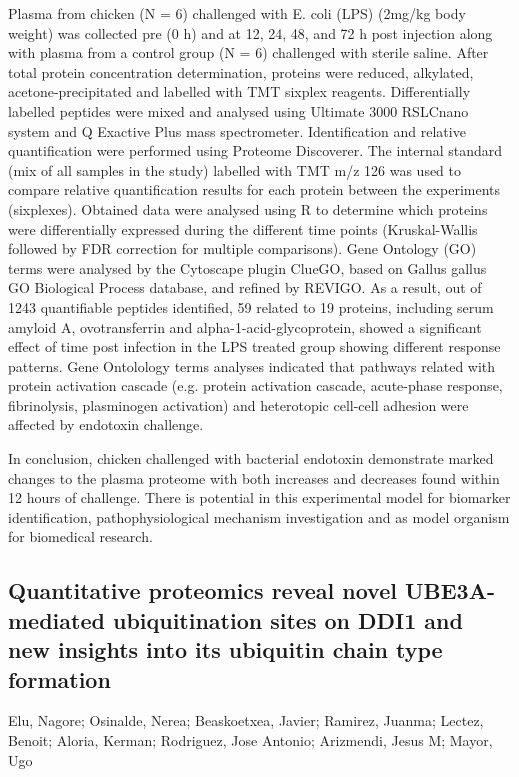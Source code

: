 {Plasma from chicken (N = 6) challenged with E. coli (LPS) (2mg/kg body weight) was collected pre (0 h) and at 12, 24, 48, and 72 h post injection along with plasma from a control group (N = 6) challenged with sterile saline. After total protein concentration determination, proteins were reduced, alkylated, acetone-precipitated and labelled with TMT sixplex reagents. Differentially labelled peptides were mixed and analysed using Ultimate 3000 RSLCnano system and Q Exactive Plus mass spectrometer. Identification and relative quantification were performed using Proteome Discoverer. The internal standard (mix of all samples in the study) labelled with TMT m/z 126 was used to compare relative quantification results for each protein between the experiments (sixplexes). Obtained data were analysed using R to determine which proteins were differentially expressed during the different time points (Kruskal-Wallis followed by FDR correction for multiple comparisons). Gene Ontology (GO) terms were analysed by the Cytoscape plugin ClueGO, based on Gallus gallus GO Biological Process database, and refined by REVIGO. As a result, out of 1243 quantifiable peptides identified, 59 related to 19 proteins, including serum amyloid A, ovotransferrin and alpha-1-acid-glycoprotein, showed a significant effect of time post infection in the LPS treated group showing different response patterns. Gene Ontolology terms analyses indicated that pathways related with protein activation cascade (e.g. protein activation cascade, acute-phase response, fibrinolysis, plasminogen activation) and heterotopic cell-cell adhesion were affected by endotoxin challenge.

In conclusion, chicken challenged with bacterial endotoxin demonstrate marked changes to the plasma proteome with both increases and decreases found within 12 hours of challenge. There is potential in this experimental model for biomarker identification, pathophysiological mechanism investigation and as model organism for biomedical research.


\subsection*{\color{eubicRed} Quantitative proteomics reveal novel UBE3A-mediated ubiquitination sites on DDI1 and new insights into its ubiquitin chain type formation}
{\color{eubicGray}Elu, Nagore;
Osinalde, Nerea;
Beaskoetxea, Javier;
Ramirez, Juanma;
Lectez, Benoit;
Aloria, Kerman;
Rodriguez, Jose Antonio;
Arizmendi, Jesus M;
Mayor, Ugo}

}
